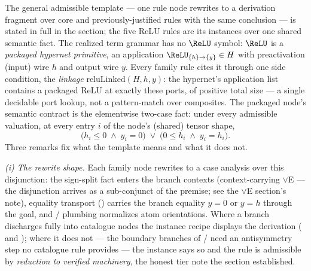 

\begin{brecipe}\label{rec:relu-template}
The general admissible template --- one rule node rewrites to a
derivation fragment over core and previously-justified rules with the
same conclusion --- is stated in full in the 
section; the five ReLU rules are its instances over one shared
semantic fact. The realized term grammar has no $\ReLU$ symbol:
$\ReLU$ is a \emph{packaged hypernet primitive}, an application
$\ReLU_{\{h\}\to\{y\}} \in H$ with preactivation (input) wire $h$ and
output wire $y$. Every family rule cites it through one side
condition, the \emph{linkage} $\mathrm{reluLinked}(H, h, y)$: the
hypernet's application list contains a packaged ReLU at exactly these
ports, of positive total size --- a single decidable port lookup, not a
pattern-match over composites. The packaged node's semantic contract
is the elementwise two-case fact: under every admissible valuation,
at every entry $i$ of the node's (shared) tensor shape,
\[
\bigl(h_i \leq 0 \;\wedge\; y_i = 0\bigr)
\;\vee\;
\bigl(0 \leq h_i \;\wedge\; y_i = h_i\bigr).
\]
Three remarks fix what the template means and what it does not.

\emph{(i) The rewrite shape.} Each family node rewrites to a case
analysis over this disjunction: the sign-split fact enters the branch
contexts (context-carrying $\vee$E --- the disjunction arrives as a
sub-conjunct of the premise; see the $\vee$E section's note), equality
transport () carries the branch equality $y = 0$ or
$y = h$ through the goal, and /
plumbing normalizes atom orientations. Where a branch discharges fully
into catalogue nodes the instance recipe displays the derivation
( and ); where it does not ---
the boundary branches of / need
an antisymmetry step no catalogue rule provides --- the instance says
so and the rule is admissible by \emph{reduction to verified
machinery}, the honest tier note the  section
established.


\end{brecipe}
